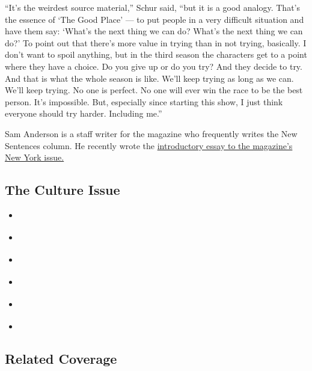 ``It's the weirdest source material,'' Schur said, ``but it is a good
analogy. That's the essence of `The Good Place' --- to put people in a
very difficult situation and have them say: `What's the next thing we
can do? What's the next thing we can do?' To point out that there's more
value in trying than in not trying, basically. I don't want to spoil
anything, but in the third season the characters get to a point where
they have a choice. Do you give up or do you try? And they decide to
try. And that is what the whole season is like. We'll keep trying as
long as we can. We'll keep trying. No one is perfect. No one will ever
win the race to be the best person. It's impossible. But, especially
since starting this show, I just think everyone should try harder.
Including me.''

Sam Anderson is a staff writer for the magazine who frequently writes
the New Sentences column. He recently wrote the
\href{https://www.nytimes3xbfgragh.onion/interactive/2018/06/06/magazine/love-city-new-york-introduction.html}{introductory
essay to the magazine's New York issue.}

\hypertarget{the-culture-issue}{%
\subsection{The Culture Issue}\label{the-culture-issue}}

\begin{itemize}
\tightlist
\item
  \href{https://www.nytimes3xbfgragh.onion/interactive/2018/10/03/magazine/lady-gaga-movie-star-is-born.html}{}
\item
  \href{https://www.nytimes3xbfgragh.onion/interactive/2018/10/03/magazine/morality-social-justice-art-entertainment.html}{}
\item
  \href{https://www.nytimes3xbfgragh.onion/interactive/2018/10/04/magazine/good-place-michael-schur-philosophy.html}{}
\item
  \href{https://www.nytimes3xbfgragh.onion/interactive/2018/10/04/magazine/barry-jenkins-james-baldwin-if-beale-street-could-talk.html}{}
\item
  \href{https://www.nytimes3xbfgragh.onion/interactive/2018/10/05/magazine/instagram-cindy-sherman-ugly-beauty.html}{}
\item
  \href{https://www.nytimes3xbfgragh.onion/interactive/2018/10/05/magazine/culture-moments-2018.html}{}
\end{itemize}

\hypertarget{related-coverage}{%
\subsection{Related Coverage}\label{related-coverage}}

